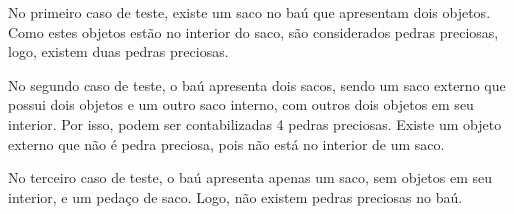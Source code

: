 No primeiro caso de teste, existe um saco no baú que apresentam dois objetos. Como estes objetos estão no interior do saco, são considerados pedras preciosas, logo, existem duas pedras preciosas.

No segundo caso de teste, o baú apresenta dois sacos, sendo um saco externo que possui dois objetos e um outro saco interno, com outros dois objetos em seu interior. Por isso, podem ser contabilizadas 4 pedras preciosas. Existe um objeto externo que não é pedra preciosa, pois não está no interior de um saco.

No terceiro caso de teste, o baú apresenta apenas um saco, sem objetos em seu interior, e um pedaço de saco. Logo, não existem pedras preciosas no baú.
